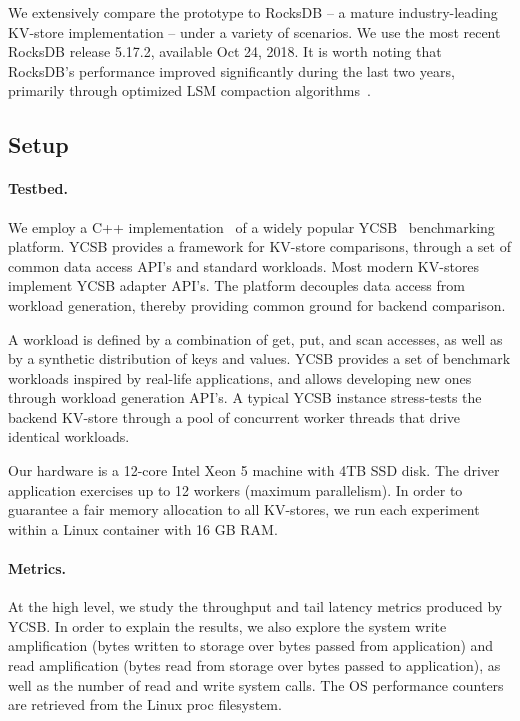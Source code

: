 We extensively compare the \sys\/ prototype to RocksDB -- a mature industry-leading KV-store implementation  -- under a variety of scenarios.  We use the most recent RocksDB release 5.17.2, available Oct 24, 2018.  
It is worth noting that RocksDB's performance improved significantly during the last two years, primarily through 
optimized LSM compaction algorithms~\cite{CallaghanCompaction}.   

\subsection{Setup}

\paragraph{Testbed.} We employ a C++ implementation~\cite{Cpp-YCSB} of a widely popular 
YCSB~\cite{Cooper:2010:BCS:1807128.1807152} benchmarking platform. 
YCSB provides a framework for KV-store comparisons, through a set of common data access API's and standard workloads. 
Most modern KV-stores implement  YCSB adapter API's. The platform decouples data access from workload generation, 
thereby providing common ground for backend comparison. 

A workload is defined by a combination of get, put, and scan accesses, as well as by a synthetic distribution of keys and values. 
YCSB provides a set of benchmark workloads inspired by real-life applications, and allows developing new ones through workload 
generation API's. A typical YCSB instance stress-tests the backend KV-store through a pool of concurrent worker threads that drive identical
workloads. %

Our hardware is a 12-core Intel Xeon 5 machine with 4TB SSD disk. The driver application exercises up to 12 workers 
(maximum parallelism). In order to guarantee a fair memory allocation to all KV-stores, we run each experiment 
within a Linux container with 16 GB RAM. 

\paragraph{Metrics.} At the high level, we study the throughput and tail latency metrics produced by YCSB. 
In order to explain the results, we also explore the system write amplification (bytes written to storage over 
bytes passed from application) and read amplification (bytes read from storage over bytes passed to application), 
as well as the number of read and write system calls. The OS performance counters are retrieved from the Linux
proc filesystem. 

